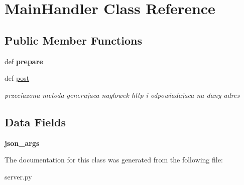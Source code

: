 \hypertarget{classserver_1_1_main_handler}{\section{Main\-Handler Class Reference}
\label{classserver_1_1_main_handler}
}
\subsection*{Public Member Functions}
\begin{DoxyCompactItemize}
\item 
\hypertarget{classserver_1_1_main_handler_a4def33e7e267224a32281b4c91dd72df}{def {\bfseries prepare}}\label{classserver_1_1_main_handler_a4def33e7e267224a32281b4c91dd72df}

\item 
\hypertarget{classserver_1_1_main_handler_a49eef07c2e643292b02accabc4f0c182}{def \hyperlink{classserver_1_1_main_handler_a49eef07c2e643292b02accabc4f0c182}{post}}\label{classserver_1_1_main_handler_a49eef07c2e643292b02accabc4f0c182}

\begin{DoxyCompactList}\small\item\em przeciazona metoda generujaca naglowek http i odpowiadajaca na dany adres \end{DoxyCompactList}\end{DoxyCompactItemize}
\subsection*{Data Fields}
\begin{DoxyCompactItemize}
\item 
\hypertarget{classserver_1_1_main_handler_abc9a4e223e2ce9056552867e25e65681}{{\bfseries json\-\_\-args}}\label{classserver_1_1_main_handler_abc9a4e223e2ce9056552867e25e65681}

\end{DoxyCompactItemize}


The documentation for this class was generated from the following file\-:\begin{DoxyCompactItemize}
\item 
server.\-py\end{DoxyCompactItemize}
